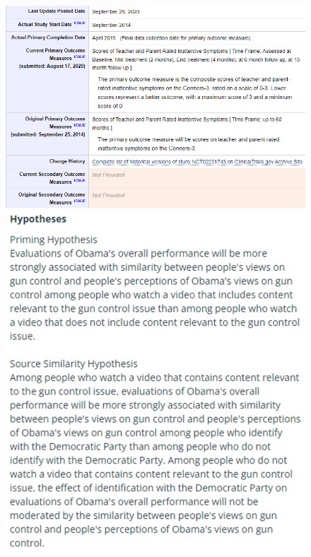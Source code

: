 \documentclass[authordate, meta]{jote-new-article}
\begin{document}
\begin{figure}[t]
  \begin{fullwidth}
    \label{fig:rId9}

    \includegraphics[height=.24\paperheight]{media/image2.png}
    \includegraphics[width=.24\paperheight]{media/image3.png}


\end{fullwidth}
\end{figure}
\end{document}
